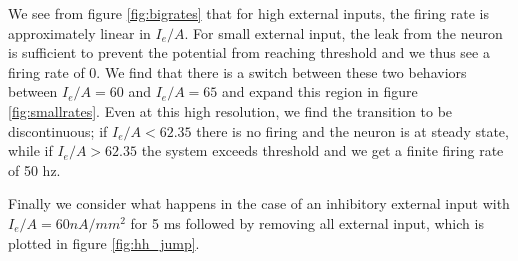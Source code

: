 \documentclass{article}
\begin{document}
We see from figure \ref{fig:bigrates} that for high external inputs, the firing rate is approximately linear in $I_e/A$. For small external input, the leak from the neuron is sufficient to prevent the potential from reaching threshold and we thus see a firing rate of 0. We find that there is a switch between these two behaviors between $I_e/A = 60$ and $I_e/A = 65$ and expand this region in figure \ref{fig:smallrates}. Even at this high resolution, we find the transition to be discontinuous; if $I_e/A < 62.35$ there is no firing and the neuron is at steady state, while if $I_e/A > 62.35$ the system exceeds threshold and we get a finite firing rate of 50 hz.

Finally we consider what happens in the case of an inhibitory external input with $I_e/A = 60 nA/mm^2$ for 5 ms followed by removing all external input, which is plotted in figure \ref{fig:hh_jump}. 
\end{document}
